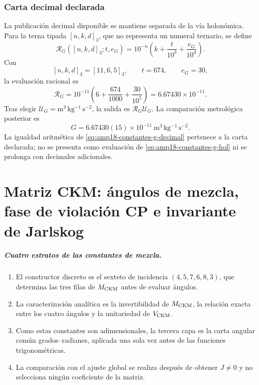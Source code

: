 \subsection{Carta decimal declarada}

La publicación decimal disponible se mantiene separada de la vía holonómica.
Para la terna tipada \([n,k,d]_3\), que no representa un numeral ternario,
se define
\begin{equation}
 \label{eq:amp18-constantes-lector-g}
 \mathcal R_G([n,k,d]_3;t,e_G)
 =10^{-n}\left(k+\frac{t}{10^3}+\frac{e_G}{10^d}\right).
\end{equation}
Con
\[
 [n,k,d]_3=[11,6,5]_3,
 \qquad t=674,
 \qquad e_G=30,
\]
la evaluación racional es
\begin{equation}
 \label{eq:amp18-constantes-g-decimal}
 \boxed{
 \mathcal R_G
 =10^{-11}\left(6+\frac{674}{1000}+\frac{30}{10^5}\right)
 =6.67430\times10^{-11}.}
\end{equation}
Tras elegir
\(\mathcal U_G=\mathrm{m^3\,kg^{-1}\,s^{-2}}\), la salida es
\(\mathcal R_G\mathcal U_G\). La comparación metrológica posterior es
\[
 G=6.67430(15)\times10^{-11}\
 \mathrm{m^3\,kg^{-1}\,s^{-2}}.
\]
La igualdad aritmética de \eqref{eq:amp18-constantes-g-decimal} pertenece a
la carta declarada; no se presenta como evaluación de
\eqref{eq:amp18-constantes-g-hol} ni se prolonga con decimales adicionales.

\chapter[Matriz CKM y violación CP]{Matriz CKM: ángulos de mezcla, fase de
violación CP e invariante de Jarlskog}

\paragraph{Cuatro estratos de las constantes de mezcla.}
\begin{enumerate}
 \item El constructor discreto es el sexteto de incidencia
 \((4,5,7,6,8,3)\), que determina las tres filas de
 \(M_{\rm CKM}\) antes de evaluar ángulos.
 \item La caracterización analítica es la invertibilidad de
 \(M_{\rm CKM}\), la relación exacta entre los cuatro ángulos y la
 unitariedad de \(V_{\rm CKM}\).
 \item Como estas constantes son adimensionales, la tercera capa es la
 carta angular común grados--radianes, aplicada una sola vez antes de las
 funciones trigonométricas.
 \item La comparación con el ajuste global se realiza después de obtener
 \(J\neq0\) y no selecciona ningún coeficiente de la matriz.
\end{enumerate}


